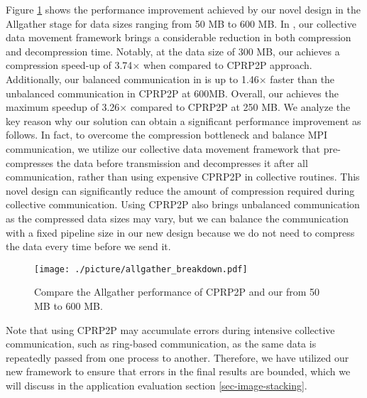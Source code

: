 Figure \ref{fig-new-design} shows the performance improvement achieved by our novel design in the Allgather stage for data sizes ranging from 50 MB to 600 MB. In {\pname}, our collective data movement framework brings a considerable reduction in both compression and decompression time. Notably, at the data size of 300 MB, our {\pname} achieves a compression speed-up of 3.74$\times$ when compared to CPRP2P approach. Additionally, our balanced communication in {\pname} is up to 1.46$\times$ faster than the unbalanced communication in CPRP2P at 600MB. Overall, our {\pname} achieves the maximum speedup of 3.26$\times$ compared to CPRP2P at 250 MB. We analyze the key reason why our solution can obtain a significant performance improvement as follows. In fact, to overcome the compression bottleneck and balance MPI communication, we utilize our collective data movement framework that pre-compresses the data before transmission and decompresses it after all communication, rather than using expensive CPRP2P in collective routines. This novel design can significantly reduce the amount of compression required during collective communication. Using CPRP2P also brings unbalanced communication as the compressed data sizes may vary, but we can balance the communication with a fixed pipeline size in our new design because we do not need to compress the data every time before we send it. 
\begin{figure}[ht]
    \centering
    {\texttt{[image: ./picture/allgather\_breakdown.pdf]}}
    \caption{Compare the Allgather performance of CPRP2P and our {\pname} from 50 MB to 600 MB.} 
    \label{fig-new-design}
\end{figure}


Note that using CPRP2P may accumulate errors during intensive collective communication, such as ring-based communication, as the same data is repeatedly passed from one process to another. Therefore, we have utilized our new framework to ensure that errors in the final results are bounded, which we will discuss in the application evaluation section \ref{sec-image-stacking}.



